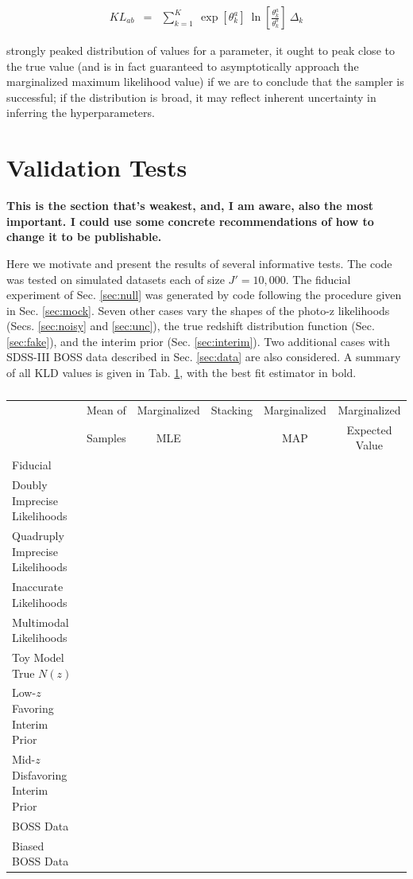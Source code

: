 \documentclass[preprint]{aastex}
\begin{document}
\begin{eqnarray}
\label{eq:kl}
KL_{ab} &=& \sum_{k=1}^{K}\ \exp[\theta_{k}^{a}]\ 
\ln\left[\frac{\theta_{k}^{a}}{\theta_{k}^{b}}\right]\ \Delta_{k}
\end{eqnarray}

strongly peaked distribution of values for a parameter, it ought to peak close 
to the true value (and is in fact guaranteed to asymptotically approach the 
marginalized maximum likelihood value) if we are to conclude that the sampler 
is successful; if the distribution is broad, it may reflect inherent 
uncertainty in inferring the hyperparameters.

\clearpage
\section{Validation Tests}
\label{sec:valid}

\textbf{This is the section that's weakest, and, I am aware, also the most 
important.  I could use some concrete recommendations of how to change it to be 
publishable.}

Here we motivate and present the results of several informative tests.  The 
code was tested on simulated datasets each of size $J'=10,000$.  The fiducial 
experiment of Sec. \ref{sec:null} was generated by code following the procedure 
given in Sec. \ref{sec:mock}.  Seven other cases vary the shapes of the photo-z 
likelihoods (Secs. \ref{sec:noisy} and \ref{sec:unc}), the true redshift 
distribution function (Sec. \ref{sec:fake}), and the interim prior (Sec. 
\ref{sec:interim}).  Two additional cases with SDSS-III BOSS data described in 
Sec. \ref{sec:data} are also considered.  A summary of all KLD values is given 
in Tab. \ref{tab:kld}, with the best fit estimator in bold.

\begin{table}
\begin{tabular}{lccccc}
& Mean of & Marginalized & Stacking & Marginalized & Marginalized\\
& Samples & MLE & & MAP & Expected Value\\
Fiducial &&&&&\\
Doubly Imprecise Likelihoods &&&&&\\
Quadruply Imprecise Likelihoods &&&&&\\
Inaccurate Likelihoods &&&&&\\
Multimodal Likelihoods &&&&&\\
Toy Model True $N(z)$ &&&&&\\
Low-$z$ Favoring Interim Prior &&&&&\\
Mid-$z$ Disfavoring Interim Prior &&&&&\\
BOSS Data &&&&&\\
Biased BOSS Data &&&&&\\
\end{tabular}
\caption{}
\label{tab:kld}
\end{table}
\end{document}
